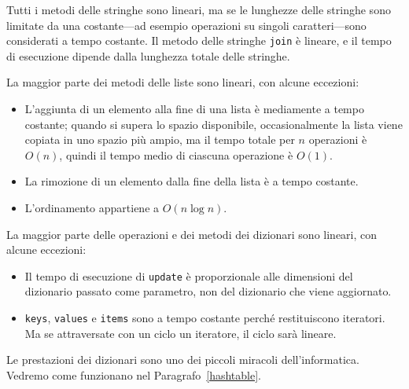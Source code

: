 \documentclass[10pt]{book}
\begin{document}
Tutti i metodi delle stringhe sono lineari, ma se le lunghezze delle stringhe sono limitate da una costante---ad esempio operazioni su singoli caratteri---sono considerati a tempo costante.
Il metodo delle stringhe {\tt join} è lineare, e il tempo di esecuzione dipende dalla lunghezza totale delle stringhe.

La maggior parte dei metodi delle liste sono lineari, con alcune eccezioni:

\begin{itemize}

\item L'aggiunta di un elemento alla fine di una lista è mediamente a tempo costante; quando si supera lo spazio disponibile, occasionalmente la lista viene copiata in uno spazio più ampio, ma il tempo totale per $n$ operazioni è $O(n)$, quindi il tempo medio di ciascuna operazione è $O(1)$.

\item La rimozione di un elemento dalla fine della lista è a tempo costante.

\item L'ordinamento appartiene a $O(n \log n)$.

\end{itemize}

La maggior parte delle operazioni e dei metodi dei dizionari sono lineari, con alcune eccezioni:

\begin{itemize}

\item Il tempo di esecuzione di {\tt update} è proporzionale alle dimensioni del dizionario passato come parametro, non del dizionario che viene aggiornato.

\item {\tt keys}, {\tt values} e {\tt items} sono a tempo costante perché restituiscono iteratori. Ma se attraversate con un ciclo un iteratore, il ciclo sarà lineare.

\end{itemize}

Le prestazioni dei dizionari sono uno dei piccoli miracoli dell'informatica. Vedremo come funzionano nel Paragrafo~\ref{hashtable}.
\end{document}
